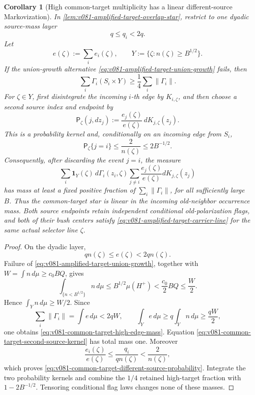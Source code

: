 \documentclass[10pt]{article}
\newtheorem{corollary}[theorem]{Corollary}
\begin{document}
\begin{corollary}[High common-target multiplicity has a linear different-source Markovization]
\label{cor:v081-common-target-linear-markovization}
In \cref{lem:v081-amplified-target-overlap-star}, restrict to one dyadic source-mass layer
\[
q\le q_i<2q.
\]
Let
\[
e(\zeta):=\sum_i e_i(\zeta),
\qquad
Y:=\{\zeta:n(\zeta)\ge B^{1/2}\}.
\]
If the union-growth alternative
\eqref{eq:v081-amplified-target-union-growth} fails, then
\begin{equation}
\label{eq:v081-common-target-high-edge-mass}
\boxed{
\sum_i\Gamma_i(S_i\times Y)
\ge
\frac14\sum_i\|\Gamma_i\|.
}
\end{equation}
For \(\zeta\in Y\), first disintegrate the incoming \(i\)-th edge by \(K_{i,\zeta}\), and then choose
a second source index and endpoint by
\begin{equation}
\label{eq:v081-common-target-second-source-kernel}
\mathsf P_\zeta(j,dz_j)
:=
\frac{e_j(\zeta)}{e(\zeta)}\,dK_{j,\zeta}(z_j).
\end{equation}
This is a probability kernel and, conditionally on an incoming edge from \(S_i\),
\begin{equation}
\label{eq:v081-common-target-different-source-probability}
\mathsf P_\zeta\{j=i\}
\le
\frac{2}{n(\zeta)}
\le
2B^{-1/2}.
\end{equation}
Consequently, after discarding the event \(j=i\), the measure
\begin{equation}
\label{eq:v081-common-target-linear-two-star}
\boxed{
\sum_i
\mathbf1_Y(\zeta)\,
d\Gamma_i(z_i,\zeta)
\sum_{j\ne i}
\frac{e_j(\zeta)}{e(\zeta)}
dK_{j,\zeta}(z_j)
}
\end{equation}
has mass at least a fixed positive fraction of
\(\sum_i\|\Gamma_i\|\), for all sufficiently large \(B\).  Thus the common-target star is linear in
the incoming old-neighbor occurrence mass.  Both source endpoints retain independent conditional
old-polarization flags, and both of their bush centers satisfy
\eqref{eq:v081-amplified-target-carrier-line} for the same actual selector line \(\zeta\).
\end{corollary}

\begin{proof}
On the dyadic layer,
\[
qn(\zeta)\le e(\zeta)<2qn(\zeta).
\]
Failure of \eqref{eq:v081-amplified-target-union-growth}, together with
\(W=\int n\,d\mu\ge c_0BQ\), gives
\[
\int_{\{n<B^{1/2}\}}n\,d\mu
\le
B^{1/2}\mu(H^+)
<
\frac{c_0}{2}BQ
\le
\frac W2.
\]
Hence \(\int_Yn\,d\mu\ge W/2\).  Since
\[
\sum_i\|\Gamma_i\|
=
\int e\,d\mu
<
2qW,
\qquad
\int_Ye\,d\mu
\ge
q\int_Yn\,d\mu
\ge
\frac{qW}{2},
\]
one obtains \eqref{eq:v081-common-target-high-edge-mass}.  Equation
\eqref{eq:v081-common-target-second-source-kernel} has total mass one.  Moreover
\[
\frac{e_i(\zeta)}{e(\zeta)}
\le
\frac{q_i}{qn(\zeta)}
<
\frac2{n(\zeta)},
\]
which proves \eqref{eq:v081-common-target-different-source-probability}.  Integrate the two
probability kernels and combine the \(1/4\) retained high-target fraction with
\(1-2B^{-1/2}\).  Tensoring conditional flag laws changes none of these masses.
\end{proof}
\end{document}
